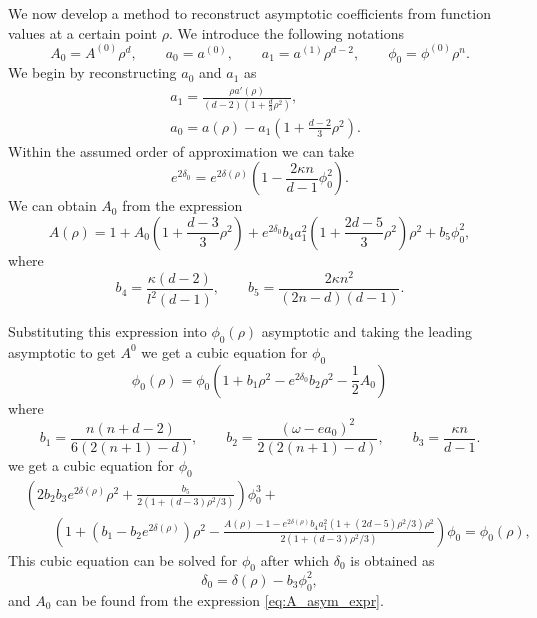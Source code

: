 \documentclass[a4paper,12pt]{article}
\begin{document}
We now develop a method to reconstruct asymptotic coefficients from function values at a certain point $\rho$. We introduce the following notations
\begin{equation}
	A_0 = A^{(0)}\rho^d,\qquad a_0 = a^{(0)},\qquad a_1 = a^{(1)}\rho^{d-2},\qquad \phi_0 = \phi^{(0)}\rho^n.
\end{equation}
We begin by reconstructing $a_0$ and $a_1$ as
\begin{subequations}
\begin{align}
	&a_1 = \frac{\rho a'(\rho)}{(d-2)\left(1 + \frac{d}{3}\rho^2\right)},\\
	&a_0 = a(\rho) - a_1\left(1 + \frac{d-2}{3}\rho^2\right).
\end{align}
\end{subequations}
Within the assumed order of approximation we can take
\begin{equation}
	e^{2\delta_0} = e^{2\delta(\rho)}\left(1 - \frac{2\kappa n}{d-1} \phi_0^2\right).
\end{equation}
We can obtain $A_0$ from the expression
\begin{equation}
\label{eq:A_asym_expr}
	A(\rho) = 1 + A_0\left(1 + \frac{d-3}{3}\rho^2\right) + e^{2\delta_0} b_4 a_1^2 \left(1 + \frac{2d-5}{3}\rho^2\right) \rho^{2} + b_5\phi_0^2,
\end{equation}
where
\begin{equation}
	b_4 = \frac{\kappa (d-2)}{l^2 (d-1)},\qquad b_5 = \frac{2\kappa n^2}{(2n - d)(d-1)}.
\end{equation}

Substituting this expression into $\phi_0(\rho)$ asymptotic and taking the leading asymptotic to get $A^0$ we get a cubic equation for $\phi_0$
\begin{equation}
	\phi_0(\rho) = \phi_0 \left(1 + b_1\rho^2 - e^{2\delta_0} b_2\rho^2 - \frac{1}{2} A_0\right)
\end{equation}
where
\begin{equation}
	b_1 = \frac{n(n + d - 2)}{6(2(n+1) - d)},\qquad b_2 = \frac{(\omega - e a_0)^2}{2(2(n+1) - d)},\qquad b_3 = \frac{\kappa n}{d-1}.
\end{equation}
we get a cubic equation for $\phi_0$
\begin{equation}
\begin{split}
	&\left(2 b_2 b_3 e^{2\delta(\rho)}\rho^2 + \frac{b_5}{2(1 + (d-3)\rho^2/3)}\right)\phi_0^3 + \\
	&\qquad\left(1 + (b_1 - b_2 e^{2\delta(\rho)})\rho^2 - \frac{A(\rho) - 1 - e^{2\delta(\rho)} b_4 a_1^2 (1 + (2d - 5)\rho^2/3)\rho^2}{2(1 + (d-3)\rho^2/3)}\right)\phi_0 = \phi_0(\rho),
\end{split}
\end{equation}
This cubic equation can be solved for $\phi_0$ after which $\delta_0$ is obtained as
\begin{equation}
	\delta_0 = \delta(\rho) - b_3 \phi_0^2,
\end{equation}
and $A_0$ can be found from the expression \eqref{eq:A_asym_expr}.
\end{document}
